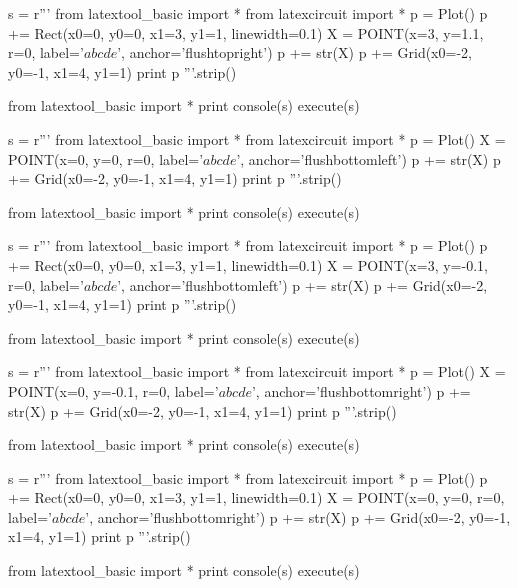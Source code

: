 \begin{python}
s = r'''
from latextool_basic import *
from latexcircuit import *
p = Plot()
p += Rect(x0=0, y0=0, x1=3, y1=1, linewidth=0.1)
X = POINT(x=3, y=1.1, r=0, label='$abcde$', anchor='flushtopright')
p += str(X)
p += Grid(x0=-2, y0=-1, x1=4, y1=1)
print p
'''.strip()

from latextool_basic import *
print console(s)
execute(s)
\end{python}


\newpage
\begin{python}
s = r'''
from latextool_basic import *
from latexcircuit import *
p = Plot()
X = POINT(x=0, y=0, r=0, label='$abcde$', anchor='flushbottomleft')
p += str(X)
p += Grid(x0=-2, y0=-1, x1=4, y1=1)
print p
'''.strip()

from latextool_basic import *
print console(s)
execute(s)
\end{python}

\begin{python}
s = r'''
from latextool_basic import *
from latexcircuit import *
p = Plot()
p += Rect(x0=0, y0=0, x1=3, y1=1, linewidth=0.1)
X = POINT(x=3, y=-0.1, r=0, label='$abcde$', anchor='flushbottomleft')
p += str(X)
p += Grid(x0=-2, y0=-1, x1=4, y1=1)
print p
'''.strip()

from latextool_basic import *
print console(s)
execute(s)
\end{python}



\newpage
\begin{python}
s = r'''
from latextool_basic import *
from latexcircuit import *
p = Plot()
X = POINT(x=0, y=-0.1, r=0, label='$abcde$', anchor='flushbottomright')
p += str(X)
p += Grid(x0=-2, y0=-1, x1=4, y1=1)
print p
'''.strip()

from latextool_basic import *
print console(s)
execute(s)
\end{python}


\begin{python}
s = r'''
from latextool_basic import *
from latexcircuit import *
p = Plot()
p += Rect(x0=0, y0=0, x1=3, y1=1, linewidth=0.1)
X = POINT(x=0, y=0, r=0, label='$abcde$', anchor='flushbottomright')
p += str(X)
p += Grid(x0=-2, y0=-1, x1=4, y1=1)
print p
'''.strip()

from latextool_basic import *
print console(s)
execute(s)
\end{python}


